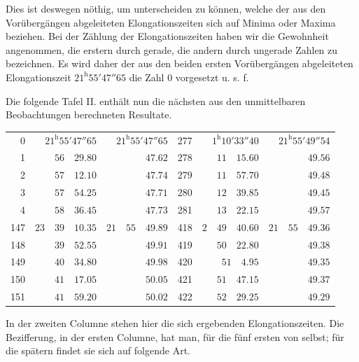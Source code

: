 Dies ist deswegen nöthig, um unterscheiden zu können, welche der aus den Vorübergängen abgeleiteten Elongationszeiten sich auf Minima oder Maxima beziehen. Bei der Zählung der Elongationszeiten haben wir die Gewohnheit angenommen, die erstern durch gerade, die andern durch ungerade Zahlen zu bezeichnen. Es wird daher der aus den beiden ersten Vorübergängen abgeleiteten Elongationszeit $21^{\mathrm{h}}55'47''65$ die Zahl 0 vorgesetzt u. s. f.

Die folgende Tafel II. enthält nun die nächsten aus den unmittelbaren Beobachtungen berechneten Resultate.
\begin{center}
\begingroup\fontsize{9}{11}\selectfont\setlength{\tabcolsep}{4pt}
\begin{tabular}{r|r|r||r|r|r}
0 & $21^{\mathrm{h}}55'47''65$ & $21^{\mathrm{h}}55'47''65$ & 277 & $1^{\mathrm{h}}10'33''40$ & $21^{\mathrm{h}}55'49''54$ \\
1 & $56\quad29.80$ & $47.62$ & 278 & $11\quad15.60$ & $49.56$ \\
2 & $57\quad12.10$ & $47.74$ & 279 & $11\quad57.70$ & $49.48$ \\
3 & $57\quad54.25$ & $47.71$ & 280 & $12\quad39.85$ & $49.45$ \\
4 & $58\quad36.45$ & $47.73$ & 281 & $13\quad22.15$ & $49.57$ \\[7pt]
147 & $23\quad39\quad10.35$ & $21\quad55\quad49.89$ & 418 & $2\quad49\quad40.60$ & $21\quad55\quad49.36$ \\
148 & $39\quad52.55$ & $49.91$ & 419 & $50\quad22.80$ & $49.38$ \\
149 & $40\quad34.80$ & $49.98$ & 420 & $51\quad4.95$ & $49.35$ \\
150 & $41\quad17.05$ & $50.05$ & 421 & $51\quad47.15$ & $49.37$ \\
151 & $41\quad59.20$ & $50.02$ & 422 & $52\quad29.25$ & $49.29$
\end{tabular}\endgroup
\end{center}

In der zweiten Columne stehen hier die sich ergebenden Elongationszeiten. Die Bezifferung, in der ersten Columne, hat man, für die fünf ersten von selbst; für die spätern findet sie sich auf folgende Art.


